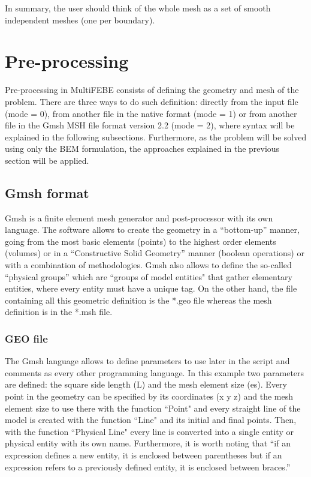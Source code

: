 \documentclass[A4]{article}
\begin{document}
In summary, the user should think of the whole mesh as a set of smooth independent meshes (one per boundary).

\section{Pre-processing} 

Pre-processing in MultiFEBE consists of defining the geometry and mesh of the problem. There are three ways to do such definition: directly from the input file (mode = 0), from another file in the native format (mode = 1) or from another file in the Gmsh MSH file format version 2.2 (mode = 2), where syntax will be explained in the following subsections. Furthermore, as the problem will be solved using only the BEM formulation, the approaches explained in the previous section will be applied.      

\subsection{Gmsh format}

Gmsh \cite{gmsh, gmshweb} is a finite element mesh generator and post-processor with its own language. The software allows to create the geometry in a “bottom-up” manner, going from the most basic elements (points) to the highest order elements (volumes) or in a “Constructive Solid Geometry” manner (boolean operations) or with a combination of methodologies. Gmsh also allows to define  the so-called “physical groups” which are ``groups of model entities" that gather elementary entities, where every entity must have a unique tag. On the other hand, the file containing all this geometric definition is the *.geo file whereas the mesh definition is in the *.msh file. 

\subsubsection{GEO file}

The Gmsh language allows to define parameters to use later in the script and comments as every other programming language. In this example two parameters are defined: the square side length (L) and the mesh element size (es). Every point in the geometry can be specified by its coordinates (x y z) and the mesh element size to use there with the function ``Point" and every straight line of the model is created with the function ``Line" and its initial and final points. Then, with the function ``Physical Line" every line is converted into a single entity or physical entity with its own name. Furthermore, it is worth noting that “if an expression defines a new entity, it is enclosed between parentheses but if an expression refers to a previously defined entity, it is enclosed between braces.” \cite{gmshweb} 
\end{document}
